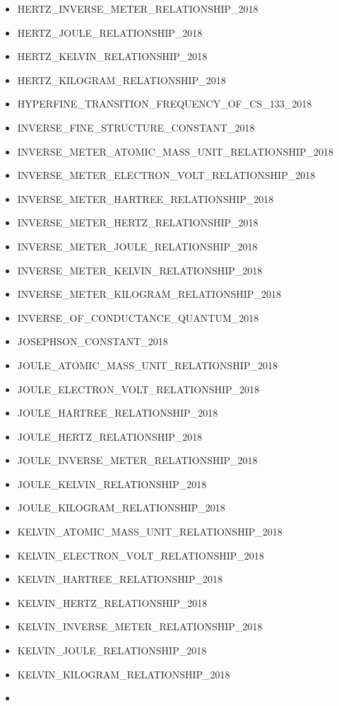 \begin{itemize}
\item
  HERTZ\_INVERSE\_METER\_RELATIONSHIP\_2018
\item
  HERTZ\_JOULE\_RELATIONSHIP\_2018
\item
  HERTZ\_KELVIN\_RELATIONSHIP\_2018
\item
  HERTZ\_KILOGRAM\_RELATIONSHIP\_2018
\item
  HYPERFINE\_TRANSITION\_FREQUENCY\_OF\_CS\_133\_2018
\item
  INVERSE\_FINE\_STRUCTURE\_CONSTANT\_2018
\item
  INVERSE\_METER\_ATOMIC\_MASS\_UNIT\_RELATIONSHIP\_2018
\item
  INVERSE\_METER\_ELECTRON\_VOLT\_RELATIONSHIP\_2018
\item
  INVERSE\_METER\_HARTREE\_RELATIONSHIP\_2018
\item
  INVERSE\_METER\_HERTZ\_RELATIONSHIP\_2018
\item
  INVERSE\_METER\_JOULE\_RELATIONSHIP\_2018
\item
  INVERSE\_METER\_KELVIN\_RELATIONSHIP\_2018
\item
  INVERSE\_METER\_KILOGRAM\_RELATIONSHIP\_2018
\item
  INVERSE\_OF\_CONDUCTANCE\_QUANTUM\_2018
\item
  JOSEPHSON\_CONSTANT\_2018
\item
  JOULE\_ATOMIC\_MASS\_UNIT\_RELATIONSHIP\_2018
\item
  JOULE\_ELECTRON\_VOLT\_RELATIONSHIP\_2018
\item
  JOULE\_HARTREE\_RELATIONSHIP\_2018
\item
  JOULE\_HERTZ\_RELATIONSHIP\_2018
\item
  JOULE\_INVERSE\_METER\_RELATIONSHIP\_2018
\item
  JOULE\_KELVIN\_RELATIONSHIP\_2018
\item
  JOULE\_KILOGRAM\_RELATIONSHIP\_2018
\item
  KELVIN\_ATOMIC\_MASS\_UNIT\_RELATIONSHIP\_2018
\item
  KELVIN\_ELECTRON\_VOLT\_RELATIONSHIP\_2018
\item
  KELVIN\_HARTREE\_RELATIONSHIP\_2018
\item
  KELVIN\_HERTZ\_RELATIONSHIP\_2018
\item
  KELVIN\_INVERSE\_METER\_RELATIONSHIP\_2018
\item
  KELVIN\_JOULE\_RELATIONSHIP\_2018
\item
  KELVIN\_KILOGRAM\_RELATIONSHIP\_2018
\item

\end{itemize}
